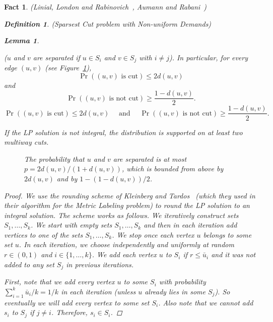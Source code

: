 \documentclass[twoside,leqno,twocolumn]{article}
\newtheorem{lemma}[theorem]{Lemma}
\newtheorem{Definition}[theorem]{Definition}
\newtheorem{fact}[theorem]{Fact}
\begin{document}
\begin{fact}{\sc (Linial, London and Rabinovich~\cite{LLR}, Aumann and Rabani~\cite{AR})}
\begin{Definition} {\sc (Sparsest Cut problem with Non-uniform Demands)}
\begin{lemma}
\begin{itemize}
($u$ and $v$ are separated if $u\in S_i$ and $v\in S_j$ with $i\neq j$).
In particular, for every edge $(u,v)$ (see Figure~\ref{fig:graph-prob-cut}),
\ifSODA
$$
\Pr((u, v) \text{ is cut}) \leq 2d(u,v)$$ and $$\Pr((u,v)  \text{ is not cut}) \geq \frac{1 - d(u,v)}{2}.$$
\else
$$
\Pr((u, v) \text{ is cut}) \leq 2d(u,v) \quad\text{ and }\quad
\Pr((u,v)  \text{ is not cut}) \geq \frac{1 - d(u,v)}{2}.
$$
\fi
\end{itemize}
If the LP solution is not integral, the distribution is supported on at least two multiway cuts.
\end{lemma}
\begin{figure}
\centering
{}
\caption{The probability that $u$ and $v$ are separated is at most $p = 2d(u,v) / (1 + d(u,v))$, which is bounded from above by $2d(u,v)$ and by $1 - (1-d(u,v))/2$.}
\label{fig:graph-prob-cut}
\end{figure}
\begin{proof}
We use the rounding scheme of Kleinberg and Tardos~\cite{KT02} (which they used in their algorithm for the Metric Labeling problem)
to round the LP solution to an integral solution. The scheme works as follows.
We iteratively construct sets $S_1,\dots, S_k$. We start with empty sets
$S_1,\dots, S_k$ and then in each iteration add vertices to one of the sets $S_1,\dots, S_k$. We stop once
each vertex $u$ belongs to some set $u$. In each iteration, we choose independently and uniformly at random $r\in (0,1)$ and $i\in \{1,\dots, k\}$.
We add each vertex $u$ to $S_i$ if $r\leq \bar u_i$ and it was not added to any set $S_j$ in previous iterations.

First, note that we add every vertex $u$ to some $S_i$ with probability $\sum_{i=1}^k \bar u_i/k = 1/k$ in each iteration
(unless $u$ already lies in some $S_j$). So eventually we will add every vertex to some set $S_i$.
Also note that we cannot add $s_i$ to $S_j$ if $j\neq i$. Therefore, $s_i\in S_i$.


\end{proof}
\end{Definition}
\end{fact}
\end{document}
